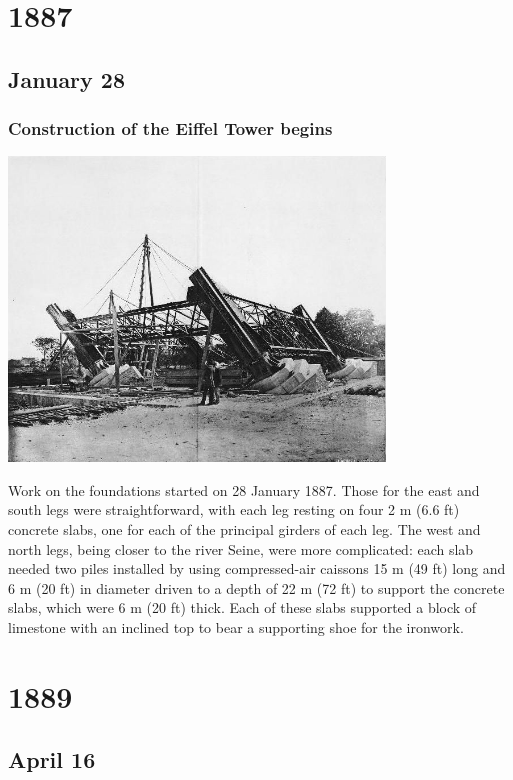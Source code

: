 \documentclass[11pt]{report}
\begin{document}
\chapter{1887}
\section{January 28}
\subsection{Construction of the Eiffel Tower begins}
\vspace{2mm}\begin{center}\includegraphics[width=10cm]{./img/eiffelTowerConstruction.jpg}\end{center}
Work on the foundations started on 28 January 1887. Those for the east and south legs were straightforward, with each leg resting on four 2 m (6.6 ft) concrete slabs, one for each of the principal girders of each leg. The west and north legs, being closer to the river Seine, were more complicated: each slab needed two piles installed by using compressed-air caissons 15 m (49 ft) long and 6 m (20 ft) in diameter driven to a depth of 22 m (72 ft) to support the concrete slabs, which were 6 m (20 ft) thick. Each of these slabs supported a block of limestone with an inclined top to bear a supporting shoe for the ironwork.

\chapter{1889}
\section{April 16}
\end{document}
